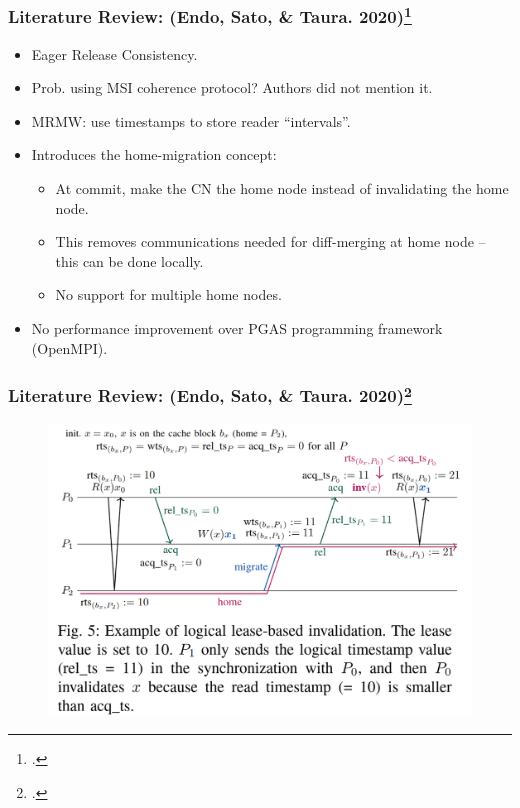\documentclass{beamer}
\begin{document}
\begin{frame}
    \frametitle{Literature Review: (Endo, Sato, \& Taura. 2020)\footcite{EndoWataru2020MADD}}
    \begin{itemize}
        \item Eager Release Consistency.
        \item Prob. using MSI coherence protocol? Authors did not mention it.
        \item MRMW: use timestamps to store reader ``intervals''.
        \item {
            Introduces the home-migration concept:
            \begin{itemize}
                \item At commit, make the CN the home node instead of invalidating the home node.
                \item This removes communications needed for diff-merging at home node -- this can be done locally.
                \item No support for multiple home nodes.
            \end{itemize}
        }
        \item {
            No performance improvement over PGAS programming framework (OpenMPI).
        }
    \end{itemize}
\end{frame}

\begin{frame}
    \frametitle{Literature Review: (Endo, Sato, \& Taura. 2020)\footcite{EndoWataru2020MADD}}
    \begin{figure}
        \includegraphics[width=\linewidth]{w12_slides_resources/menps.fig5.png}
    \end{figure}
\end{frame}
\end{document}
